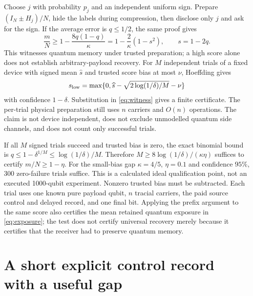 \documentclass[11pt]{article}
\begin{document}
Choose $j$ with probability $p_j$ and an independent uniform sign. Prepare
$(I_N\pm H_j)/N$, hide the labels during compression, then disclose only $j$
and ask for the sign. If the average error is $q\le1/2$, the same proof gives
\begin{equation}
 \frac mN\ge1-\frac{8q(1-q)}\kappa
 =1-\frac2\kappa(1-s^2),\qquad s=1-2q. \label{eq:witness}
\end{equation}
This witnesses quantum memory under trusted preparation; a high score alone
does not establish arbitrary-payload recovery. For $M$ independent trials of
a fixed device with signed mean $\widehat s$ and trusted score bias at most
$\nu$, Hoeffding gives
\begin{equation}
 s_{\rm low}=\max\{0,\widehat s-\sqrt{2\log(1/\delta)/M}-\nu\}
\end{equation}
with confidence $1-\delta$. Substitution in \eqref{eq:witness} gives a finite
certificate. The per-trial physical preparation still uses $n$ carriers and
$O(n)$ operations. The claim is not device independent, does not exclude
unmodelled quantum side channels, and does not count only successful trials.

If all $M$ signed trials succeed and trusted bias is zero, the exact binomial
bound is $q\le1-\delta^{1/M}\le\log(1/\delta)/M$. Therefore
$M\ge8\log(1/\delta)/(\kappa\eta)$ suffices to certify $m/N\ge1-\eta$.
For the small-bias gap $\kappa=4/5$, $\eta=0.1$ and confidence $95\%$, 300
zero-failure trials suffice. This is a calculated ideal qualification point,
not an executed 1000-qubit experiment. Nonzero trusted bias must be subtracted.
Each trial uses one known pure payload qubit, $n$ tracial carriers, the paid
source control and delayed record, and one final bit. Applying the prefix
argument to the same score also certifies the mean retained quantum exposure
in \eqref{eq:exposure}; the test does not certify universal recovery merely
because it certifies that the receiver had to preserve quantum memory.

\section{A short explicit control record with a useful gap}
\end{document}
